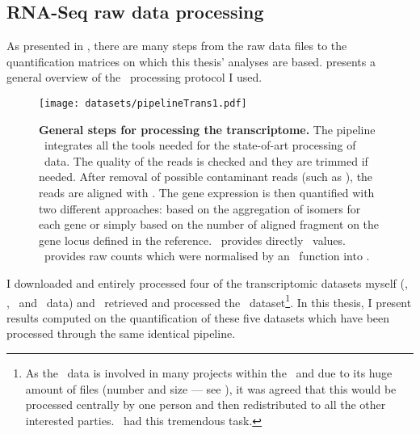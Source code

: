 \subsection{RNA-Seq raw data processing}

As presented in , there are many steps from the raw data
files to the quantification matrices on which this thesis' analyses are based.
 presents a general overview of the \Rnaseq\ processing
protocol I used.\mybr\

\begin{figure}
    \texttt{[image: datasets/pipelineTrans1.pdf]}\centering
    \caption[General steps for processing the transcriptomic
    data]{\label{fig:pipelineTrans}\textbf{General steps for processing the
    transcriptome.} The pipeline \irap\ integrates
    all the tools needed for the state-of-art
    processing of \Rnaseq\ data. The quality of the reads is checked and they
    are trimmed if needed. After removal of possible contaminant reads (such as
    ), the reads
    are aligned with \toph. The gene expression is then quantified with two
    different approaches: based on the aggregation of isomers for each gene or
    simply based on the number of aligned fragment on the gene locus defined in
    the reference. \cuffl\ provides directly \FPKM\ values. \htseq\ provides
    raw counts which were normalised by an \irap\ function into \FPKM.}
\end{figure}

I downloaded and entirely processed four of the transcriptomic datasets
myself (\castle, \vt, \ibm\ and \uhlen\ data) and
\nuno\ retrieved and processed the \gtex\ dataset\footnote{As
the \Gtex\ data is involved in many projects within the \EBI\
and due to its huge amount of files (number and  size --- see ),
it was agreed that this would be processed centrally by one person and then
redistributed to all the other interested parties. \nuno\ had this
tremendous task.}.
In this thesis,
I present results computed on the quantification of these
five datasets which have been processed through the same identical pipeline.\mybr\

